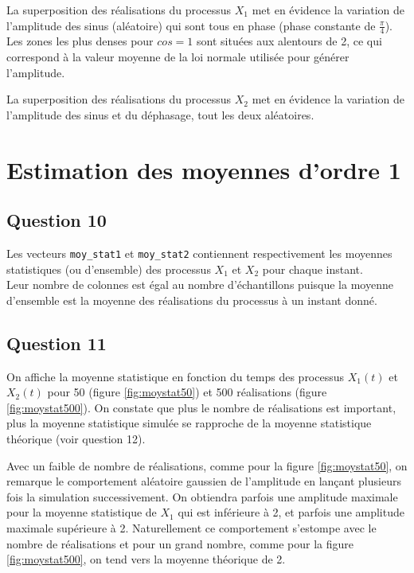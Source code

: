 \documentclass{article}
\begin{document}
La superposition des réalisations du processus $X_1$ met en évidence la variation de l'amplitude des sinus (aléatoire) qui sont tous en phase (phase constante de $\frac{\pi}{4}$). Les zones les plus denses pour $\mathit{cos} = 1$ sont situées aux alentours de 2, ce qui correspond à la valeur moyenne de la loi normale utilisée pour générer l'amplitude.

La superposition des réalisations du processus $X_2$ met en évidence la variation de l'amplitude des sinus et du déphasage, tout les deux aléatoires.

\section{Estimation des moyennes d'ordre 1}

\subsection*{Question 10}
Les vecteurs \texttt{moy\_stat1} et \texttt{moy\_stat2} contiennent respectivement les moyennes statistiques (ou d'ensemble) des processus $X_1$ et $X_2$ pour chaque instant. \\
Leur nombre de colonnes est égal au nombre d'échantillons puisque la moyenne d'ensemble est la moyenne des réalisations du processus à un instant donné.


\subsection*{Question 11}
On affiche la moyenne statistique en fonction du temps des processus $X_1(t)$ et $X_2(t)$ pour 50 (figure \ref{fig:moystat50}) et 500 réalisations (figure \ref{fig:moystat500}). On constate que plus le nombre de réalisations est important, plus la moyenne statistique simulée se rapproche de la moyenne statistique théorique (voir question 12).

Avec un faible de nombre de réalisations, comme pour la figure \ref{fig:moystat50}, on remarque le comportement aléatoire gaussien de l'amplitude en lançant plusieurs fois la simulation successivement. On obtiendra parfois une amplitude maximale pour la moyenne statistique de $X_1$ qui est inférieure à 2, et parfois une amplitude maximale supérieure à 2. Naturellement ce comportement s'estompe avec le nombre de réalisations et pour un grand nombre, comme pour la figure \ref{fig:moystat500}, on tend vers la moyenne théorique de 2.
\end{document}
